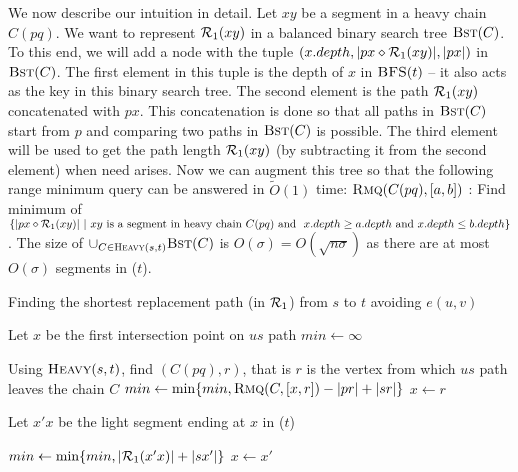 We now describe our intuition in detail.  Let $xy$ be a segment in a heavy chain
$C(pq)$. We want to represent $\mathcal{R}_1(xy)$ in a
balanced binary search tree $\textsc{Bst}(C)$. To this end, we will add a node with
the tuple $(x.depth,| px \diamond \mathcal{R}_1(xy) |, |px|)$  in $\textsc{Bst}(C)$.
The first element in this tuple is the depth of $x$
in $\textsc{BFS}(t)$ --  it also acts as the key in this binary search tree. The second element
is the path $ \mathcal{R}_1(xy)$  concatenated with $px$. This concatenation is done so that all  paths
in $\textsc{Bst}(C)$ start from $p$ and comparing two paths in $\textsc{Bst}(C)$ is
possible. The third element will be used to get the path length $\mathcal{R}_1(xy)$ (by subtracting it from
the second element) when
need arises. Now we can augment
this tree so that the following range minimum query can be answered in $\tilde O(1)$ time:
$\textsc{Rmq}(C(pq),[a,b])$ : Find minimum of $\{|px \conc \TON(xy)|\ |\ xy \ \text{is a segment in heavy chain $C(pq)$ and }\ x.depth \ge a.depth \ \text{and}\  x.depth \le b.depth \}$.
The size of $\cup_{C \in \textsc{Heavy}(s,t)}\textsc{Bst}(C)$ is $O(\sigma) = O(\sqrt{n\sigma})$ as there are
at most $O(\sigma)$ segments in \SBFS($t$).
\iflong
\begin{algorithm}
%
  \caption{Finding the shortest replacement path  (in $\mathcal{R}_1$) from $s$ to $t$ avoiding $e(u,v)$ }
  \label{fig:findR1R2}
Let $x$ be  the first intersection point on $us$ path\;
$min \leftarrow \infty$ \;

{
    {
        Using $\textsc{Heavy}(s,t)$, find $(C(pq),r)$, that is $r$ is the vertex from which $us$
        path leaves the chain $C$\;
        $min\leftarrow \min\{ min, \textsc{Rmq}(C, [x,r]) - |pr| + |sr| \}$\;
        $x \leftarrow r$\;
    }
    {
        Let $x'x$ be the  light segment ending at $x$ in \SBFS($t$) 

        $min \leftarrow \min\{ min, |\mathcal{R}_1(x'x)| + |sx'| \}$\;
        $x \leftarrow x'$\;
    }
}
\end{algorithm}
\fi



